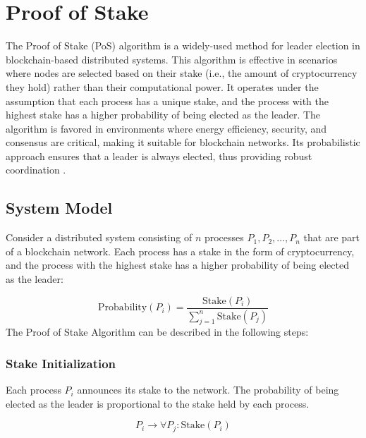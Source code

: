 \section{Proof of Stake}

The Proof of Stake (PoS) algorithm is a widely-used method for leader election in blockchain-based distributed systems. This algorithm is effective in scenarios where nodes are selected based on their stake (i.e., the amount of cryptocurrency they hold) rather than their computational power. It operates under the assumption that each process has a unique stake, and the process with the highest stake has a higher probability of being elected as the leader. The algorithm is favored in environments where energy efficiency, security, and consensus are critical, making it suitable for blockchain networks. Its probabilistic approach ensures that a leader is always elected, thus providing robust coordination \cite{Ref12}.

\subsection{System Model}
Consider a distributed system consisting of \(n\) processes \(P_1, P_2, \ldots, P_n\) that are part of a blockchain network. Each process has a stake in the form of cryptocurrency, and the process with the highest stake has a higher probability of being elected as the leader:

\[
\text{Probability}(P_i) = \frac{\text{Stake}(P_i)}{\sum_{j=1}^{n} \text{Stake}(P_j)}
\]
The Proof of Stake Algorithm can be described in the following steps:

\subsubsection{Stake Initialization}

Each process \(P_i\) announces its stake to the network. The probability of being elected as the leader is proportional to the stake held by each process.

\begin{equation}
P_i \rightarrow \forall P_j: \text{Stake}(P_i)
\end{equation}

